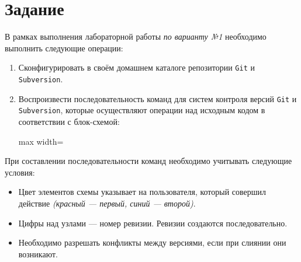 \section{Задание}

В рамках выполнения лабораторной работы \textit{по варианту №1} необходимо выполнить следующие операции:
\begin{enumerate}
  \item Сконфигурировать в своём домашнем каталоге репозитории \texttt{Git} и \texttt{Subversion}.
  \item Воспроизвести последовательность команд для систем контроля версий \texttt{Git} и \texttt{Subversion}, которые осуществляют операции над исходным кодом в соответствии с блок-схемой:
  \begin{center}
    \begin{adjustbox}{max width=\textwidth}
      
    \end{adjustbox}
  \end{center}
\end{enumerate}

При составлении последовательности команд необходимо учитывать следующие условия:
\begin{itemize}
  \item Цвет элементов схемы указывает на пользователя, который совершил действие \textit{(красный --- первый, синий --- второй)}.
  \item Цифры над узлами --- номер ревизии. Ревизии создаются последовательно.
  \item Необходимо разрешать конфликты между версиями, если при слиянии они возникают.
\end{itemize}